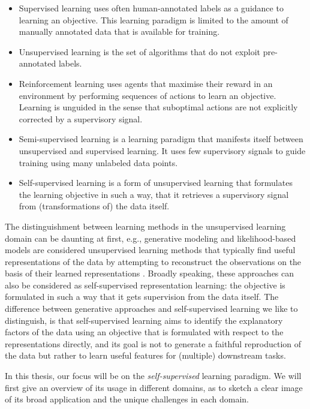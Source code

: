 \begin{itemize}
    \item Supervised learning uses often human-annotated labels as a guidance to learning an objective. This learning paradigm is limited to the amount of manually annotated data that is available for training.
    \item Unsupervised learning is the set of algorithms that do not exploit pre-annotated labels.
    \item Reinforcement learning uses agents that maximise their reward in an environment by performing sequences of actions to learn an objective. Learning is unguided in the sense that suboptimal actions are not explicitly corrected by a supervisory signal.
    \item Semi-supervised learning is a learning paradigm that manifests itself between unsupervised and supervised learning. It uses few supervisory signals to guide training using many unlabeled data points. 
    \item Self-supervised learning is a form of unsupervised learning that formulates the learning objective in such a way, that it retrieves a supervisory signal from (transformations of) the data itself.
\end{itemize}

The distinguishment between learning methods in the unsupervised learning domain can be daunting at first, e.g., generative modeling and likelihood-based models are considered unsupervised learning methods that typically find useful representations of the data by attempting to reconstruct the observations on the basis of their learned representations \cite{goodfellow2014generative, unsupervised_gan}.
Broadly speaking, these approaches can also be considered as self-supervised representation learning: the objective is formulated in such a way that it gets supervision from the data itself.
The difference between generative approaches and self-supervised learning we like to distinguish, is that self-supervised learning aims to identify the explanatory factors of the data using an objective that is formulated with respect to the representations directly, and its goal is not to generate a faithful reproduction of the data but rather to learn useful features for (multiple) downstream tasks.

In this thesis, our focus will be on the \textit{self-supervised} learning paradigm. We will first give an overview of its usage in different domains, as to sketch a clear image of its broad application and the unique challenges in each domain.

